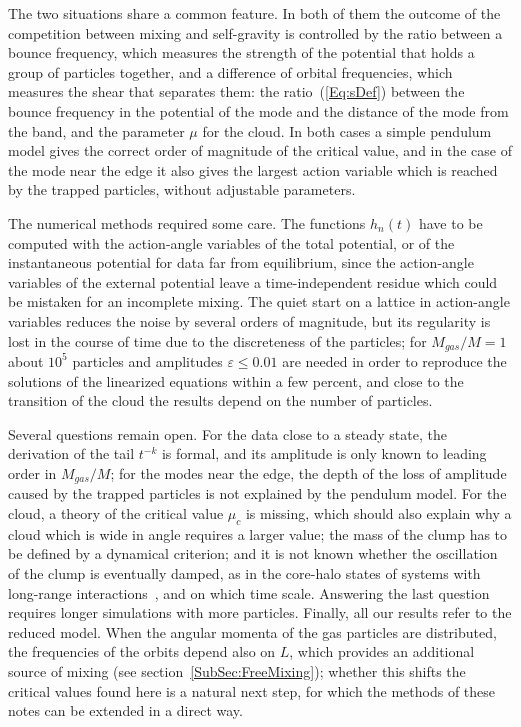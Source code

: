 The two situations share a common feature. In both of them the outcome of the competition between mixing and self-gravity is controlled by the ratio between a bounce frequency, which measures the strength of the potential that holds a group of particles together, and a difference of orbital frequencies, which measures the shear that separates them: the ratio~(\ref{Eq:sDef}) between the bounce frequency in the potential of the mode and the distance of the mode from the band, and the parameter $\mu$ for the cloud. In both cases a simple pendulum model gives the correct order of magnitude of the critical value, and in the case of the mode near the edge it also gives the largest action variable which is reached by the trapped particles, without adjustable parameters.

The numerical methods required some care. The functions $h_n(t)$ have to be computed with the action-angle variables of the total potential, or of the instantaneous potential for data far from equilibrium, since the action-angle variables of the external potential leave a time-independent residue which could be mistaken for an incomplete mixing. The quiet start on a lattice in action-angle variables reduces the noise by several orders of magnitude, but its regularity is lost in the course of time due to the discreteness of the particles; for $M_{gas}/M = 1$ about $10^5$ particles and amplitudes $\varepsilon\leq 0.01$ are needed in order to reproduce the solutions of the linearized equations within a few percent, and close to the transition of the cloud the results depend on the number of particles.

Several questions remain open. For the data close to a steady state, the derivation of the tail $t^{-k}$ is formal, and its amplitude is only known to leading order in $M_{gas}/M$; for the modes near the edge, the depth of the loss of amplitude caused by the trapped particles is not explained by the pendulum model. For the cloud, a theory of the critical value $\mu_c$ is missing, which should also explain why a cloud which is wide in angle requires a larger value; the mass of the clump has to be defined by a dynamical criterion; and it is not known whether the oscillation of the clump is eventually damped, as in the core-halo states of systems with long-range interactions~\cite{yLrPfRtTfB14}, and on which time scale. Answering the last question requires longer simulations with more particles. Finally, all our results refer to the reduced model. When the angular momenta of the gas particles are distributed, the frequencies of the orbits depend also on $L$, which provides an additional source of mixing (see section~\ref{SubSec:FreeMixing}); whether this shifts the critical values found here is a natural next step, for which the methods of these notes can be extended in a direct way. 
